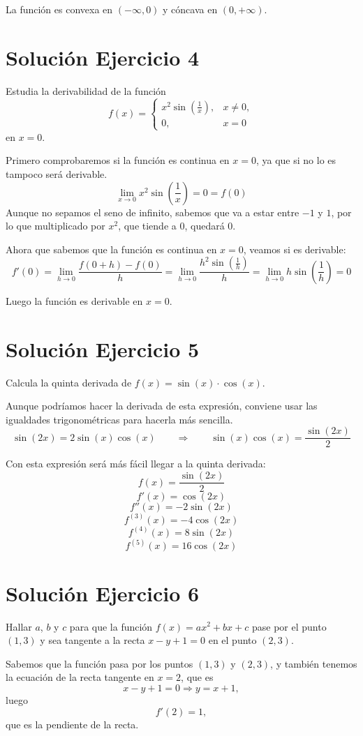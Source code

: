 \documentclass[12pt]{article}
\begin{document}
La función es convexa en \((-\infty,0)\) y cóncava en \((0,+\infty)\).

\section*{Solución Ejercicio 4}
Estudia la derivabilidad de la función
\[
f(x)=
\begin{cases}
x^2\sin\left(\frac{1}{x}\right), & x\neq 0,\\
0, & x=0
\end{cases}
\]
en \(x=0\).

Primero comprobaremos si la función es continua en \(x=0\), ya que si no lo es
tampoco será derivable.
\[
\lim_{x\to 0} x^2\sin\left(\frac{1}{x}\right)=0=f(0)
\]
Aunque no sepamos el seno de infinito, sabemos que va a estar entre \(-1\) y \(1\),
por lo que multiplicado por \(x^2\), que tiende a \(0\), quedará \(0\).

Ahora que sabemos que la función es continua en \(x=0\), veamos si es derivable:
\[
f'(0)=\lim_{h\to 0}\frac{f(0+h)-f(0)}{h}
=\lim_{h\to 0}\frac{h^2\sin\left(\frac{1}{h}\right)}{h}
=\lim_{h\to 0} h\sin\left(\frac{1}{h}\right)=0
\]

Luego la función es derivable en \(x=0\).

\section*{Solución Ejercicio 5}
Calcula la quinta derivada de \(f(x)=\sin(x)\cdot \cos(x)\).

Aunque podríamos hacer la derivada de esta expresión, conviene usar las igualdades
trigonométricas para hacerla más sencilla.
\[
\sin(2x)=2\sin(x)\cos(x)
\qquad \Rightarrow \qquad
\sin(x)\cos(x)=\frac{\sin(2x)}{2}
\]

Con esta expresión será más fácil llegar a la quinta derivada:
\[
f(x)=\frac{\sin(2x)}{2}
\]
\[
f'(x)=\cos(2x)
\]
\[
f''(x)=-2\sin(2x)
\]
\[
f^{(3)}(x)=-4\cos(2x)
\]
\[
f^{(4)}(x)=8\sin(2x)
\]
\[
f^{(5)}(x)=16\cos(2x)
\]

\section*{Solución Ejercicio 6}
Hallar \(a\), \(b\) y \(c\) para que la función \(f(x)=ax^2+bx+c\) pase por
el punto \((1,3)\) y sea tangente a la recta \(x-y+1=0\) en el punto \((2,3)\).

Sabemos que la función pasa por los puntos \((1,3)\) y \((2,3)\), y también tenemos la
ecuación de la recta tangente en \(x=2\), que es
\[
x-y+1=0 \Rightarrow y=x+1,
\]
luego
\[
f'(2)=1,
\]
que es la pendiente de la recta.
\end{document}
